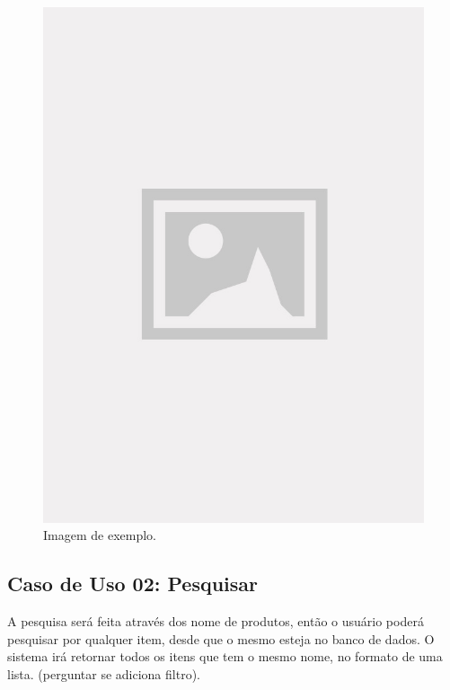 \begin{figure}[!htb]
\centering
\caption{Imagem de exemplo.}
\includegraphics[width=\linewidth]{figuras/placeholder.jpg}
\end{figure}

\subsection{Caso de Uso 02: Pesquisar}

A pesquisa será feita através dos nome de produtos, então o usuário poderá pesquisar por qualquer item, desde que o mesmo esteja no banco de dados. O sistema irá retornar todos os itens que tem o mesmo nome, no formato de uma lista. (perguntar se adiciona filtro).

